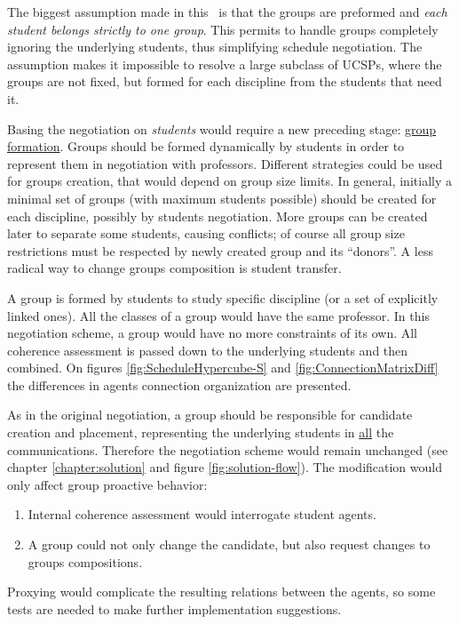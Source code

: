 \documentclass[ThesisDoc]{subfiles}
\begin{document}
The biggest assumption made in this \thisdoc\ is that the groups are preformed
and \emph{each student belongs strictly to one group}. This permits to handle
groups completely ignoring the underlying students, thus simplifying schedule
negotiation.
The assumption makes it impossible to resolve a large subclass of UCSPs, where
the groups are not fixed, but formed for each discipline from the students
that need it.

Basing the negotiation on \emph{students} would require a new preceding stage:
\underline{group formation}. Groups should be formed dynamically by students in
order to represent them in negotiation with professors. Different strategies
could be used for groups creation, that would depend on group size limits.
In general, initially a minimal set of groups (with maximum students possible)
should be created for each discipline, possibly by students negotiation.
More groups can be created later to separate some students, causing conflicts;
of course all group size restrictions must be respected by newly created
group and its ``donors''. A less radical way to change groups composition is
student transfer.

A group is formed by students to study specific discipline (or a set of
explicitly linked ones). All the classes of a group would have the same professor.
In this negotiation scheme, a group would have no more constraints of its own.
All coherence assessment is passed down to the underlying students and then
combined. On figures \ref{fig:ScheduleHypercube-S} and
\ref{fig:ConnectionMatrixDiff} the differences in agents connection organization
are presented.

As in the original negotiation, a group should be responsible for candidate
creation and placement, representing the underlying students in \underline{all}
the communications. Therefore the negotiation scheme would remain unchanged
(see chapter \ref{chapter:solution} and figure \ref{fig:solution-flow}).
The modification would only affect group proactive behavior:
\begin{enumerate}
  \item Internal coherence assessment would interrogate student agents.
  \item A group could not only change the candidate, but also request changes
        to groups compositions.
\end{enumerate}

\medskip\noindent
Proxying would complicate the resulting relations between the agents, so
some tests are needed to make further implementation suggestions.
\end{document}
